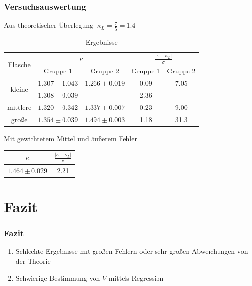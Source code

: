 \documentclass{beamer}
\begin{document}
\begin{frame}
\frametitle{Versuchsauswertung}

Aus theoretischer Überlegung: \hspace{0.2cm} $\kappa_L = \frac 75 = 1.4$

\begin{table}
\begin{tabular}{|c|c|c|c|c|}
\hline
\multirow{2}{*}{Flasche} & \multicolumn{2}{c|}{$\kappa$} & \multicolumn{2}{c|}{$\frac{|\kappa-\kappa_L|}\sigma$} \\
\cline{2-5}
& Gruppe 1 & Gruppe 2 & Gruppe 1 & Gruppe 2 \\
\hline
\multirow{2}{*}{kleine} & $1.307 \pm 1.043$ & $1.266 \pm 0.019$ & \cellcolor[rgb]{0.06,1,0} 0.09 & 
\cellcolor[rgb]{1,0,0} 7.05 \\
\cline{2-5}
& $1.308 \pm 0.039$ & & \cellcolor[rgb]{1,0.48,0} 2.36 & \\
\hline
mittlere & $1.320 \pm 0.342$ & $1.337 \pm 0.007$ & \cellcolor[rgb]{0.16,1,0} 0.23 & \cellcolor[rgb]{1,0,0} 9.00 \\
\hline
große & $1.354 \pm 0.039$ & $1.494 \pm 0.003$ & \cellcolor[rgb]{0.79,1,0} 1.18 & \cellcolor[rgb]{1,0,0} 31.3 \\
\hline
\end{tabular}
\caption{Ergebnisse}
\end{table}

Mit gewichtetem Mittel und äußerem Fehler
\begin{table}
\begin{tabular}{|c|c|}
\hline
$\bar\kappa$ & $\frac{|\kappa-\kappa_L|}\sigma$ \\
\hline
$1.464 \pm 0.029$ & 2.21 \\
\hline
\end{tabular}
\end{table}


\end{frame}



\section{Fazit}

\begin{frame}
\frametitle{Fazit}

\begin{enumerate}[-]
\item Schlechte Ergebnisse mit großen Fehlern oder sehr großen Abweichungen von der Theorie
\item Schwierige Bestimmung von $V$ mittels Regression
\end{enumerate}
\end{frame}
\end{document}
